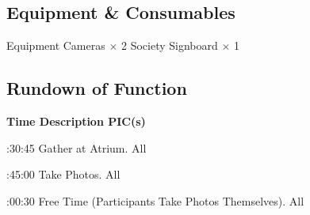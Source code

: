 \eTABLEbody
\eTABLE

\subsection{Equipment \& Consumables}
\starttabulate[|l|l|]
\NC{}Equipment\NC\NR
\HL
\NC Cameras \NC $\times$ 2 \NR
\NC Society Signboard \NC $\times$ 1 \NR
\HL
\stoptabulate

\pagebreak
\subsection{Rundown of Function}

\setupTABLE[c][1][width=1.25in]
\setupTABLE[c][2][width=3.5in]
\setupTABLE[c][3][width=1.25in]
\bTABLE
\bTABLEhead

\bTR\bTH    \bf{Time}
\eTH\bTH    \bf{Description}
\eTH\bTH    \bf{PIC(s)}
\eTH\eTR

\eTABLEhead
\bTABLEbody

\bTR{}:30:45
\eTD\bTD Gather at Atrium.
\eTD\bTD All
\eTD\eTR

\bTR{}:45:00
\eTD\bTD Take Photos.
\eTD\bTD All
\eTD\eTR

\bTR{}:00:30
\eTD\bTD Free Time (Participants Take Photos Themselves).
\eTD\bTD All
\eTD\eTR

\eTABLEbody
\eTABLE

\pagebreak
